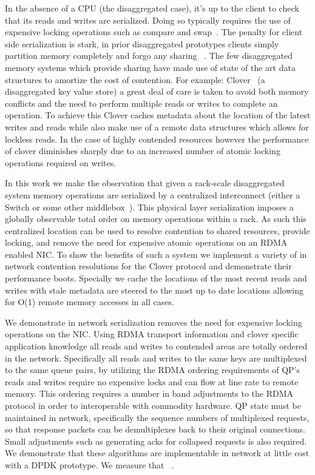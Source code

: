 In the absence of a CPU (the disaggregated case), it's up to the client to check
that its reads and writes are serialized. Doing so typically requires the use of
expensive locking operations such as compare and
swap~\cite{design-guidelines,clover}.  The penalty for client side serialization
is stark, in prior disaggregated prototypes clients simply partition memory
completely and forgo any sharing ~\cite{reigons,fastswap, legoos}. The few
disaggregated memory systems which provide sharing have made use of state of the
art data structures to amortize the cost of contention. For example:
Clover~\cite{clover} (a disaggregated key value store) a great deal of care is
taken to avoid both memory conflicts and the need to perform multiple reads or
writes to complete an operation. To achieve this Clover caches metadata about
the location of the latest writes and reads while also make use of a remote data
structures which allows for lockless reads. In the case of highly contended
resources however the performance of clover diminishes sharply due to an
increased number of atomic locking operations required on writes.

In this work we make the observation that given a rack-scale disaggregated
system memory operations are serialized by a centralized interconnect (either a
Switch or some other middlebox~\cite{disandapp}). This
physical layer serialization imposes a globally observable total order on memory
operations within a rack. As such this centralized location can be used to
resolve contention to shared resources, provide locking, and remove the need for
expensive atomic operations on an RDMA enabled NIC. To show the benefits of such
a system we implement a variety of in network contention resolutions for the
Clover protocol and demonstrate their performance boots. Specially we cache the
locations of the most recent reads and writes with stale metadata are steered to
the most up to date locations allowing for O(1) remote memory accesses in all
cases.

We demonstrate in network serialization removes the need for expensive locking
operations on the NIC. Using RDMA transport information and clover specific
application knowledge all reads and writes to contended areas are totally
ordered in the network. Specifically all reads and writes to the same keys are
multiplexed to the same queue pairs, by utilizing the RDMA ordering requirements
of QP's reads and writes require no expensive locks and can flow at line rate to
remote memory. This ordering requires a number in band adjustments to the RDMA
protocol in order to interoperable with commodity hardware. QP state must be
maintained in network, specifically the sequence numbers of multiplexed
requests, so that response packets can be demultiplexes back to their original
connections. Small adjustments such as generating acks for collapsed requests is
also required. We demonstrate that these algorithms are implementable in network
at little cost with a DPDK prototype. We measure that ~.
